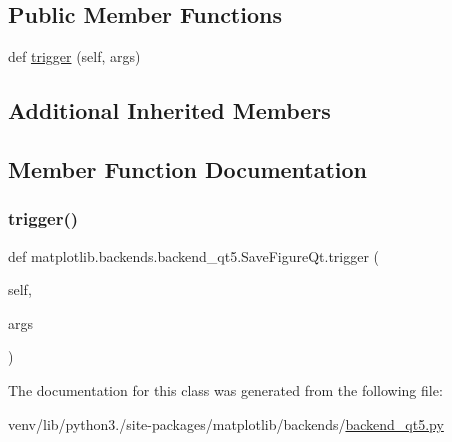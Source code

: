 \subsection*{Public Member Functions}
\begin{DoxyCompactItemize}
\item 
def \hyperlink{classmatplotlib_1_1backends_1_1backend__qt5_1_1SaveFigureQt_abe50123986034a17c108b694ae51ebc5}{trigger} (self, args)
\end{DoxyCompactItemize}
\subsection*{Additional Inherited Members}


\subsection{Member Function Documentation}
\mbox{\label{classmatplotlib_1_1backends_1_1backend__qt5_1_1SaveFigureQt_abe50123986034a17c108b694ae51ebc5}} 
\subsubsection{\texorpdfstring{trigger()}{trigger()}}
{\footnotesize\ttfamily def matplotlib.\+backends.\+backend\+\_\+qt5.\+Save\+Figure\+Qt.\+trigger (\begin{DoxyParamCaption}\item[{}]{self,  }\item[{}]{args }\end{DoxyParamCaption})}



The documentation for this class was generated from the following file\+:\begin{DoxyCompactItemize}
\item 
venv/lib/python3./site-\/packages/matplotlib/backends/\hyperlink{backend__qt5_8py}{backend\+\_\+qt5.\+py}\end{DoxyCompactItemize}
